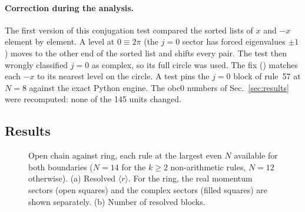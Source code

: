 \paragraph{Correction during the analysis.} The first version of this conjugation test compared the sorted lists of $x$
and $-x$ element by element. A level at $0\equiv2\pi$ (the $j=0$ sector has forced eigenvalues $\pm1$) moves to the
other end of the sorted list and shifts every pair. The test then wrongly classified $j=0$ as complex, so its full circle
was used. The fix () matches each $-x$ to its nearest level on the circle. A test pins the
$j=0$ block of rule~57 at $N=8$ against the exact Python engine. The obc0 numbers of Sec.~\ref{sec:results} were
recomputed: none of the 145 units changed.

\subsection{Results}
\begin{table}[h]
\centering\small
\resizebox{\textwidth}{!}{}
\caption{Open chain against ring at $N=14$, all sixteen rules. ``naive ref.''\ is
the expectation for the complex sectors from the identified symmetries (mirror $\Rightarrow$ COE). The one-sided rules
violate it (Table~\ref{tab:shape}). The $N=12$ table is .}
\label{tab:bc}
\end{table}

\begin{table}[h]
\centering\small

\caption{Shape of $P(r)$ in the complex momentum sectors of the ring, $N=14$: $\chi^2$ of a 10-bin histogram (9 degrees
of freedom) against the Atas surmises, and against the best Poisson+CUE mixture. A crossover from Poisson towards CUE
can pass through the COE \emph{mean}, but then its small-$r$ tail is too heavy ($P(r)\sim r^\beta$). The surmise values
of $P(r<0.15)$ are 0.261 (Poisson), 0.064 ($\beta=1$) and 0.019 ($\beta=2$). The surmise deviates from large-$N$ random
matrices by about 1\%, so $\chi^2$ of a few tens at $n\approx1.4\times10^4$ is a good fit.}
\label{tab:shape}
\end{table}

\begin{figure}[h]
\centering
{}
\caption{Open chain against ring, each rule at the largest even $N$ available for both boundaries ($N=14$ for the
$k\ge2$ non-arithmetic rules, $N=12$ otherwise). (a) Resolved $\langle r\rangle$. For the ring, the real momentum sectors
(open squares) and the complex sectors (filled squares) are shown separately. (b) Number of resolved blocks.}
\label{fig:bc}
\end{figure}

